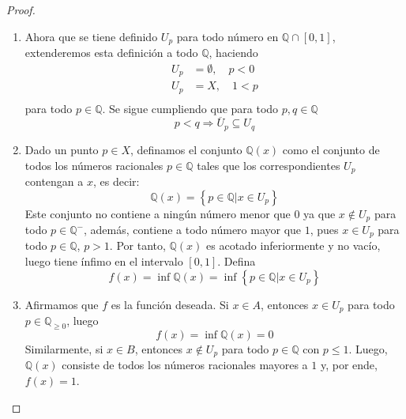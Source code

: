 \documentclass[12pt]{report}
\theoremstyle{largebreak}
\newcommand{\Cls}[1]{\ensuremath{\overline{#1}}}
\begin{document}
\begin{proof}
\begin{enumerate}
            \item Ahora que se tiene definido $U_p$ para todo número en $\mathbb{Q}\cap[0,1]$, extenderemos esta definición a todo $\mathbb{Q}$, haciendo
            \begin{equation*}
                \begin{split}
                    U_p&=\emptyset,\quad p<0\\
                    U_p&=X,\quad 1<p\\
                \end{split}
            \end{equation*}
            para todo $p\in\mathbb{Q}$. Se sigue cumpliendo que para todo $p,q\in\mathbb{Q}$
            \begin{equation*}
                p<q\Rightarrow \Cls{U}_p\subseteq U_q
            \end{equation*}
            \item Dado un punto $p\in X$, definamos el conjunto $\mathbb{Q}(x)$ como el conjunto de todos los números racionales $p\in\mathbb{Q}$ tales que los correspondientes $U_p$ contengan a $x$, es decir:
            \begin{equation*}
                \mathbb{Q}(x)=\left\{p\in\mathbb{Q}\Big|x\in U_p \right\}
            \end{equation*}
            Este conjunto no contiene a ningún número menor que $0$ ya que $x\notin U_p$ para todo $p\in\mathbb{Q}^-$, además, contiene a todo número mayor que $1$, pues $x\in U_p$ para todo $p\in\mathbb{Q}$, $p>1$. Por tanto, $\mathbb{Q}(x)$ es acotado inferiormente y no vacío, luego tiene ínfimo en el intervalo $[0,1]$. Defina
            \begin{equation*}
                f(x)=\inf\mathbb{Q}(x)=\inf\left\{p\in\mathbb{Q} \Big| x\in U_p \right\}
            \end{equation*}
            \item Afirmamos que $f$ es la función deseada. Si $x\in A$, entonces $x\in U_p$ para todo $p\in\mathbb{Q}_{\geq0}$, luego
            \begin{equation*}
                f(x)=\inf\mathbb{Q}(x)=0
            \end{equation*}
            Similarmente, si $x\in B$, entonces $x\notin U_p$ para todo $p\in\mathbb{Q}$ con $p\leq 1$. Luego, $\mathbb{Q}(x)$ consiste de todos los números racionales mayores a $1$ y, por ende, $f(x)=1$.


\end{enumerate}
\end{proof}
\end{document}
